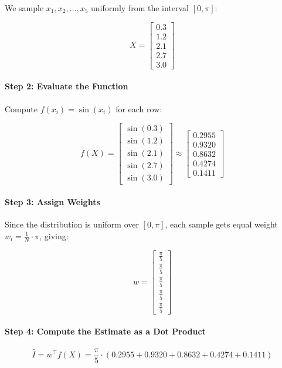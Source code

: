 We sample \( x_1, x_2, \ldots, x_5 \) uniformly from the interval \( [0, \pi] \):

\[
X = 
\begin{bmatrix}
0.3 \\
1.2 \\
2.1 \\
2.7 \\
3.0
\end{bmatrix}
\]

\paragraph{Step 2: Evaluate the Function}

Compute \( f(x_i) = \sin(x_i) \) for each row:

\[
f(X) =
\begin{bmatrix}
\sin(0.3) \\
\sin(1.2) \\
\sin(2.1) \\
\sin(2.7) \\
\sin(3.0)
\end{bmatrix}
\approx
\begin{bmatrix}
0.2955 \\
0.9320 \\
0.8632 \\
0.4274 \\
0.1411
\end{bmatrix}
\]

\paragraph{Step 3: Assign Weights}

Since the distribution is uniform over \( [0, \pi] \), each sample gets equal weight \( w_i = \frac{1}{N} \cdot \pi \), giving:

\[
w =
\begin{bmatrix}
\frac{\pi}{5} \\
\frac{\pi}{5} \\
\frac{\pi}{5} \\
\frac{\pi}{5} \\
\frac{\pi}{5}
\end{bmatrix}
\]

\paragraph{Step 4: Compute the Estimate as a Dot Product}

\[
\hat{I} = w^\top f(X) = \frac{\pi}{5} \cdot (0.2955 + 0.9320 + 0.8632 + 0.4274 + 0.1411)
\]

